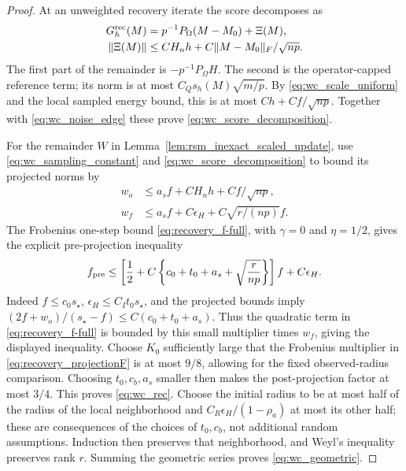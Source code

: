 \documentclass[numsec,webpdf,modern,large,namedate]{oup-authoring-template}
\theoremstyle{plain}
\theoremstyle{remark}
\newif\ifmarkchanges
\newenvironment{revision}{\begingroup\ifmarkchanges\color{red}\fi}{\endgroup}
\begin{document}
\begin{revision}
\begin{proof}
At an unweighted recovery iterate the score decomposes as
\begin{align}
 G_h^{\rm rec}(M)&=p^{-1}P_\Omega(M-M_0)+\Xi(M),\nonumber\\
 \|\Xi(M)\|&\le CH_nh+C\|M-M_0\|_F/\sqrt{np}.
 \label{eq:wc_score_decomposition}
\end{align}
The first part of the remainder is $-p^{-1}P_\Omega H$.
The second is the operator-capped reference term; its norm is at most
$C_Qs_h(M)\sqrt{m/p}$. By \eqref{eq:wc_scale_uniform} and the local sampled
energy bound, this is at most $Ch+Cf/\sqrt{np}$.
Together with \eqref{eq:wc_noise_edge} these prove
\eqref{eq:wc_score_decomposition}.

For the remainder $W$ in Lemma~\ref{lem:rsm_inexact_scaled_update}, use
\eqref{eq:wc_sampling_constant} and \eqref{eq:wc_score_decomposition} to
bound its projected norms by
\begin{align*}
 w_o&\le a_sf+CH_nh+Cf/\sqrt{np},\\
 w_f&\le a_sf+C\epsilon_H+C\sqrt{r/(np)}f.
\end{align*}
The Frobenius one-step bound \eqref{eq:recovery_f-full}, with $\gamma=0$
and $\eta=1/2$, gives the explicit pre-projection inequality
\begin{align*}
 f_{\rm pre}\le
 \left[\frac12+C\left\{c_0+t_0+a_s+\sqrt{\frac r{np}}\right\}\right]f
 +C\epsilon_H.
\end{align*}
Indeed $f\le c_0s_\star$, $\epsilon_H\le C_It_0s_\star$, and the
projected bounds imply $(2f+w_o)/(s_\star-f)\le C(c_0+t_0+a_s)$.
Thus the quadratic term in \eqref{eq:recovery_f-full} is bounded by this
small multiplier times $w_f$, giving the displayed inequality. Choose $K_0$ sufficiently large
that the Frobenius multiplier in \eqref{eq:recovery_projectionF} is at most
$9/8$, allowing for the fixed observed-radius comparison. Choosing
$t_0,c_b,a_s$ smaller then makes the post-projection factor at most $3/4$.
This proves \eqref{eq:wc_rec}. Choose the initial radius to be at most
half of the radius of the local neighborhood and
$C_R\epsilon_H/(1-\rho_a)$ at most its other half; these are consequences
of the choices of $t_0,c_b$, not additional random assumptions. Induction
then preserves that neighborhood, and Weyl's inequality preserves rank $r$. Summing the geometric
series proves \eqref{eq:wc_geometric}.


\end{proof}
\end{revision}
\end{document}
